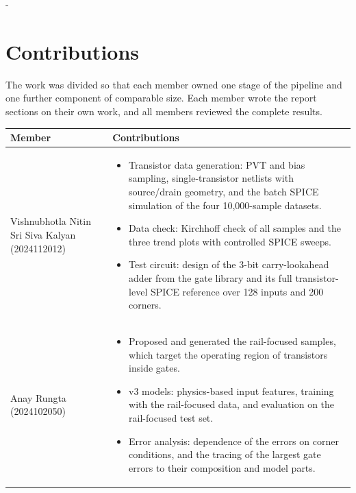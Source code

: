 \documentclass[12pt, a4paper]{article}
\makeatletter
\newcommand{\keepspace}[1]{\par\begingroup
  \setlength{\dimen@}{#1}%
  \dimen@ii\pagegoal \advance\dimen@ii-\pagetotal
  \ifdim\dimen@>\dimen@ii
    \ifdim\dimen@ii>\z@ \vfil\fi
    \break
  \fi\endgroup}
\makeatother
\begin{document}
\keepspace{565pt}
\section{Contributions}
\label{sec:contrib}

\noindent The work was divided so that each member owned one stage of the pipeline and one further component of comparable size. Each member wrote the report sections on their own work, and all members reviewed the complete results.

\begin{table}[H]
\centering
\small
\begin{tabularx}{\linewidth}{|>{\raggedright\arraybackslash}p{3.6cm}|L|}
\hline
\textbf{Member} & \textbf{Contributions} \\
\hline
Vishnubhotla Nitin Sri Siva Kalyan (2024112012) &
\vspace{-0.9em}
\begin{itemize}[leftmargin=*, nosep, topsep=0pt]
    \item Transistor data generation: PVT and bias sampling, single-transistor netlists with source/drain geometry, and the batch SPICE simulation of the four 10,000-sample datasets.
    \item Data check: Kirchhoff check of all samples and the three trend plots with controlled SPICE sweeps.
    \item Test circuit: design of the 3-bit carry-lookahead adder from the gate library and its full transistor-level SPICE reference over 128 inputs and 200 corners.
\end{itemize}
\vspace{-0.9em} \\
\hline
Anay Rungta (2024102050) &
\vspace{-0.9em}
\begin{itemize}[leftmargin=*, nosep, topsep=0pt]
    \item Proposed and generated the rail-focused samples, which target the operating region of transistors inside gates.
    \item v3 models: physics-based input features, training with the rail-focused data, and evaluation on the rail-focused test set.
    \item Error analysis: dependence of the errors on corner conditions, and the tracing of the largest gate errors to their composition and model parts.

\end{itemize}
\end{tabularx}
\end{table}
\end{document}
